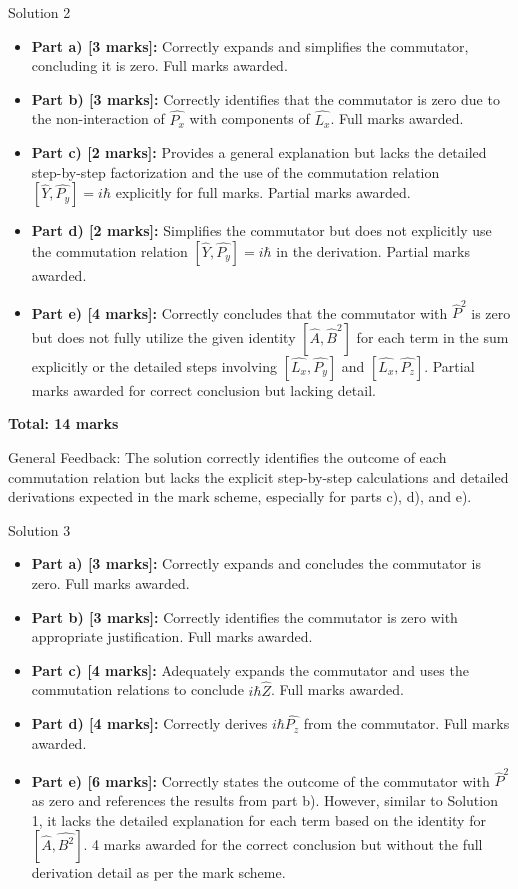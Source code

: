 \documentclass[a4paper,11pt]{article}
\begin{document}
Solution 2

\begin{itemize}
    \item \textbf{Part a) [3 marks]:} Correctly expands and simplifies the commutator, concluding it is zero. Full marks awarded.
    \item \textbf{Part b) [3 marks]:} Correctly identifies that the commutator is zero due to the non-interaction of \( \hat{P_{x}} \) with components of \( \hat{L_{x}} \). Full marks awarded.
    \item \textbf{Part c) [2 marks]:} Provides a general explanation but lacks the detailed step-by-step factorization and the use of the commutation relation \( [\hat{Y}, \hat{P_{y}}] = i\hbar \) explicitly for full marks. Partial marks awarded.
    \item \textbf{Part d) [2 marks]:} Simplifies the commutator but does not explicitly use the commutation relation \( [\hat{Y}, \hat{P_{y}}] = i\hbar \) in the derivation. Partial marks awarded.
    \item \textbf{Part e) [4 marks]:} Correctly concludes that the commutator with \( \hat{P}^2 \) is zero but does not fully utilize the given identity \( [\hat{A}, \hat{B}^2] \) for each term in the sum explicitly or the detailed steps involving \( [\hat{L_{x}}, \hat{P_{y}}] \) and \( [\hat{L_{x}}, \hat{P_{z}}] \). Partial marks awarded for correct conclusion but lacking detail.
\end{itemize}

\textbf{Total: 14 marks}

General Feedback: The solution correctly identifies the outcome of each commutation relation but lacks the explicit step-by-step calculations and detailed derivations expected in the mark scheme, especially for parts c), d), and e).

Solution 3

\begin{itemize}
    \item \textbf{Part a) [3 marks]:} Correctly expands and concludes the commutator is zero. Full marks awarded.
    \item \textbf{Part b) [3 marks]:} Correctly identifies the commutator is zero with appropriate justification. Full marks awarded.
    \item \textbf{Part c) [4 marks]:} Adequately expands the commutator and uses the commutation relations to conclude \( i\hbar\hat{Z} \). Full marks awarded.
    \item \textbf{Part d) [4 marks]:} Correctly derives \( i\hbar\hat{P_{z}} \) from the commutator. Full marks awarded.
    \item \textbf{Part e) [6 marks]:} Correctly states the outcome of the commutator with \( \hat{P}^2 \) as zero and references the results from part b). However, similar to Solution 1, it lacks the detailed explanation for each term based on the identity for \( [\hat{A}, \hat{B^2}] \). 4 marks awarded for the correct conclusion but without the full derivation detail as per the mark scheme.
\end{itemize}
\end{document}
